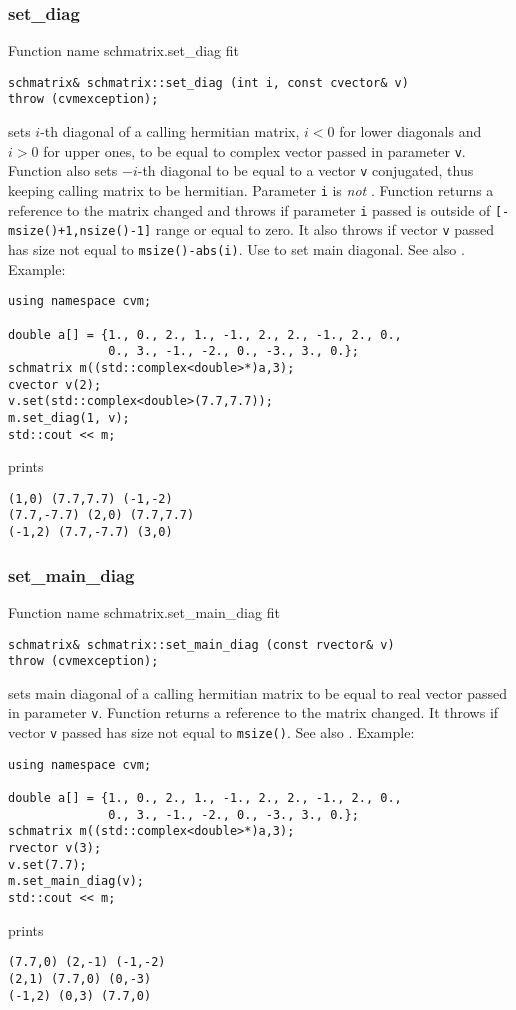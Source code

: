 \subsubsection{set\_diag}
Function%
\pdfdest name {schmatrix.set_diag} fit
\begin{verbatim}
schmatrix& schmatrix::set_diag (int i, const cvector& v)
throw (cvmexception);
\end{verbatim}
sets  \hbox{$i$-th} diagonal of a calling hermitian matrix,
$i<0$ for lower diagonals 
and $i>0$ for upper ones, to be equal to  complex vector
passed in parameter \verb"v".
Function also sets $-i$-th diagonal to
be equal to a vector \verb"v" conjugated,
thus keeping calling matrix to be hermitian.
Parameter \verb"i" is \emph{not} \Based.
Function returns a reference to
the matrix changed
and throws 
if parameter \verb"i" passed
is outside of \verb"[-msize()+1,nsize()-1]" range
or equal to zero. 
It also throws if vector \verb"v" passed has size not equal to
\verb"msize()-abs(i)".
Use 
to set  main diagonal.
See also .
Example:
\begin{Verbatim}
using namespace cvm;

double a[] = {1., 0., 2., 1., -1., 2., 2., -1., 2., 0.,
              0., 3., -1., -2., 0., -3., 3., 0.};
schmatrix m((std::complex<double>*)a,3);
cvector v(2);
v.set(std::complex<double>(7.7,7.7));
m.set_diag(1, v);
std::cout << m;
\end{Verbatim}
prints
\begin{Verbatim}
(1,0) (7.7,7.7) (-1,-2)
(7.7,-7.7) (2,0) (7.7,7.7)
(-1,2) (7.7,-7.7) (3,0)
\end{Verbatim}
\newpage



\subsubsection{set\_main\_diag}
Function%
\pdfdest name {schmatrix.set_main_diag} fit
\begin{verbatim}
schmatrix& schmatrix::set_main_diag (const rvector& v)
throw (cvmexception);
\end{verbatim}
sets  main diagonal of a calling hermitian 
matrix to be equal to  real vector
passed in parameter \verb"v".
Function returns a reference to
the matrix changed.
It throws 
if vector \verb"v" passed has  size not equal to
\verb"msize()".
See also .
Example:
\begin{Verbatim}
using namespace cvm;

double a[] = {1., 0., 2., 1., -1., 2., 2., -1., 2., 0.,
              0., 3., -1., -2., 0., -3., 3., 0.};
schmatrix m((std::complex<double>*)a,3);
rvector v(3);
v.set(7.7);
m.set_main_diag(v);
std::cout << m;
\end{Verbatim}
prints
\begin{Verbatim}
(7.7,0) (2,-1) (-1,-2)
(2,1) (7.7,0) (0,-3)
(-1,2) (0,3) (7.7,0)
\end{Verbatim}
\newpage




